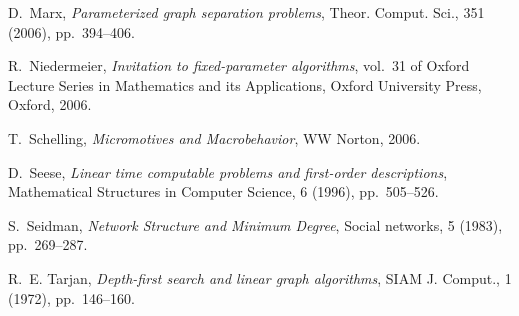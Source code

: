 \documentclass[11pt,a4paper]{article}
\begin{document}
\begin{thebibliography}{10}
{\sc D.~Marx}, {\em Parameterized graph separation problems}, Theor. Comput.
  Sci., 351 (2006), pp.~394--406.

{\sc R.~Niedermeier}, {\em Invitation to fixed-parameter algorithms}, vol.~31
  of Oxford Lecture Series in Mathematics and its Applications, Oxford
  University Press, Oxford, 2006.

{\sc T.~Schelling}, {\em {Micromotives and Macrobehavior}}, WW Norton, 2006.

{\sc D.~Seese}, {\em Linear time computable problems and first-order
  descriptions}, Mathematical Structures in Computer Science, 6 (1996),
  pp.~505--526.

{\sc S.~Seidman}, {\em {Network Structure and Minimum Degree}}, Social
  networks, 5 (1983), pp.~269--287.

{\sc R.~E. Tarjan}, {\em Depth-first search and linear graph algorithms}, SIAM
  J. Comput., 1 (1972), pp.~146--160.

\end{thebibliography}
\end{document}
